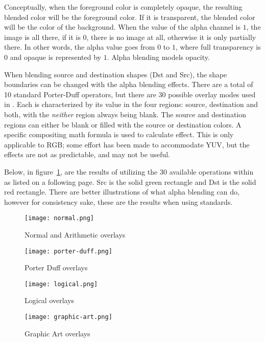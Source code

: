 Conceptually, when the foreground color is completely opaque, the resulting blended color will be the foreground color.  If it is transparent, the blended color will be the color of the background.  When the value of the alpha channel is $1$, the image is all there, if it is $0$, there is no image at all, otherwise it is only partially there.  In other words, the alpha value goes from $0$ to $1$, where full transparency is $0$ and opaque is represented by $1$.  Alpha blending models opacity. 

When blending source and destination shapes (Dst and Src), the shape boundaries can be changed with the alpha blending effects.  There are a total of 10 standard Porter-Duff operators, but there are 30 possible overlay modes used in \CGG{}.  Each is characterized by its value in the four regions: source, destination and both, with the \textit{neither} region always being blank.  The source and destination regions can either be blank or filled with the source or destination colors.  A specific compositing math formula is used to calculate effect.  This is only applicable to RGB; some effort has been made to accommodate YUV, but the effects are not as predictable, and may not be useful. 

Below, in figure~\ref{fig:normal}, are the results of utilizing the 30 available operations within \CGG{} as listed on a following page.  Src is the solid green rectangle and Dst is the solid red rectangle.  There are better illustrations of what alpha blending can do, however for consistency sake, these are the results when using standards.

\begin{figure}[htpb]
    \centering
    \texttt{[image: normal.png]}
    \caption{Normal and Arithmetic overlays}
    \label{fig:normal}
\end{figure}

\begin{figure}[htpb]
    \centering
    \texttt{[image: porter-duff.png]}
    \caption{Porter Duff overlays}
\end{figure}

\begin{figure}[htpb]
    \centering
    \texttt{[image: logical.png]}
    \caption{Logical overlays}
\end{figure}

\begin{figure}[htpb]
    \centering
    \texttt{[image: graphic-art.png]}
    \caption{Graphic Art overlays}
\end{figure}

